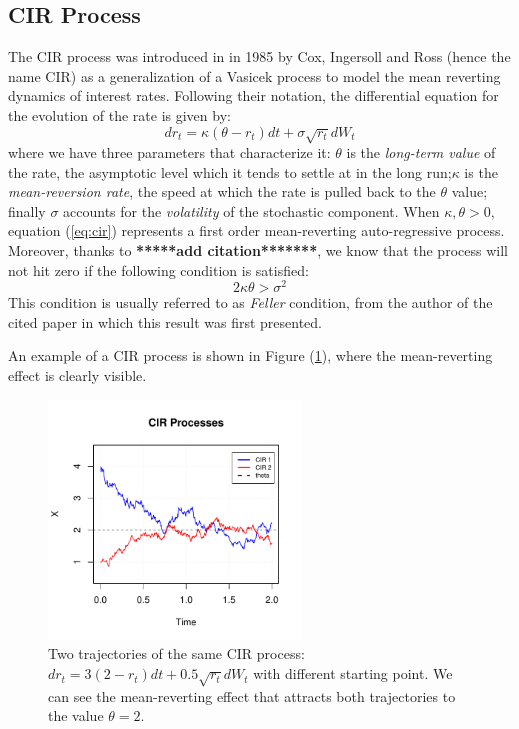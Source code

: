 \subsection{CIR Process}
The CIR process was introduced in \citep{CIR85} in 1985 by Cox, Ingersoll and Ross (hence the name CIR) as a generalization of a Vasicek process to model the mean reverting dynamics of interest rates.
Following their notation, the differential equation for the  evolution of the rate is given by:
\begin{equation}
\label{eq:cir}
	dr_t = \kappa(\theta - r_t) dt + \sigma \sqrt{r_t}dW_t
\end{equation}
where we have three parameters that characterize it: $\theta$ is the \textit{long-term value} of the rate, the asymptotic level which it tends to settle at in the long run;$\kappa$ is the \textit{mean-reversion rate}, the speed at which the rate is pulled back to the $\theta$ value; finally $\sigma$ accounts for the \textit{volatility} of the stochastic component.
When $\kappa,\theta >0$, equation (\ref{eq:cir}) represents a first order mean-reverting auto-regressive process. Moreover, thanks to \textbf{*****add citation*******}, we know that the process will not hit zero if the following condition is satisfied:
\begin{equation}
	2\kappa\theta > \sigma^2
\end{equation}
This condition is usually referred to as \textit{Feller} condition, from the author of the cited paper in which this result was first presented.

An example of a CIR process is shown in Figure (\ref{fig:cir_proc}), where the mean-reverting effect is  clearly visible.

\begin{figure}
	\centering
	\includegraphics[width=0.6\textwidth]{Images/cir_process.pdf}
	\caption[Trajectories of two CIR processes]{Two trajectories of the same CIR process: $dr_t = 3(2 - r_t) dt + 0.5 \sqrt{r_t}dW_t$ with different starting point. We can see the mean-reverting effect that attracts both trajectories to the value $\theta=2$. }
	\label{fig:cir_proc}
\end{figure}

